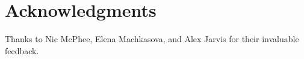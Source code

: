 \documentclass{sig-alternate}
\begin{document}


\section{Acknowledgments}
Thanks to Nic McPhee, Elena Machkasova, and Alex Jarvis for their invaluable feedback.

%

%
%
\end{document}
